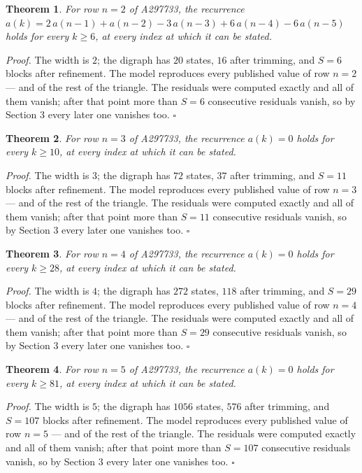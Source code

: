 \documentclass[11pt]{article}
\newtheorem{theorem}{Theorem}
\theoremstyle{definition}
\begin{document}
\begin{theorem} For row $n = 2$ of A297733, the recurrence $a(k) = 2\,a(n-1) + a(n-2) - 3\,a(n-3) + 6\,a(n-4) - 6\,a(n-5)$ holds for every $k \ge 6$, at every index at which it can be stated.\end{theorem}

{\itshape Proof.} The width is $2$; the digraph has $20$ states, $16$ after trimming, and $S = 6$ blocks after refinement. The model reproduces every published value of row $n = 2$ --- and of the rest of the triangle. The residuals were computed exactly and all of them vanish; after that point more than $S = 6$ consecutive residuals vanish, so by Section 3 every later one vanishes too. $\square$

\begin{theorem} For row $n = 3$ of A297733, the recurrence $a(k) = 0$ holds for every $k \ge 10$, at every index at which it can be stated.\end{theorem}

{\itshape Proof.} The width is $3$; the digraph has $72$ states, $37$ after trimming, and $S = 11$ blocks after refinement. The model reproduces every published value of row $n = 3$ --- and of the rest of the triangle. The residuals were computed exactly and all of them vanish; after that point more than $S = 11$ consecutive residuals vanish, so by Section 3 every later one vanishes too. $\square$

\begin{theorem} For row $n = 4$ of A297733, the recurrence $a(k) = 0$ holds for every $k \ge 28$, at every index at which it can be stated.\end{theorem}

{\itshape Proof.} The width is $4$; the digraph has $272$ states, $118$ after trimming, and $S = 29$ blocks after refinement. The model reproduces every published value of row $n = 4$ --- and of the rest of the triangle. The residuals were computed exactly and all of them vanish; after that point more than $S = 29$ consecutive residuals vanish, so by Section 3 every later one vanishes too. $\square$

\begin{theorem} For row $n = 5$ of A297733, the recurrence $a(k) = 0$ holds for every $k \ge 81$, at every index at which it can be stated.\end{theorem}

{\itshape Proof.} The width is $5$; the digraph has $1056$ states, $576$ after trimming, and $S = 107$ blocks after refinement. The model reproduces every published value of row $n = 5$ --- and of the rest of the triangle. The residuals were computed exactly and all of them vanish; after that point more than $S = 107$ consecutive residuals vanish, so by Section 3 every later one vanishes too. $\square$
\end{document}
